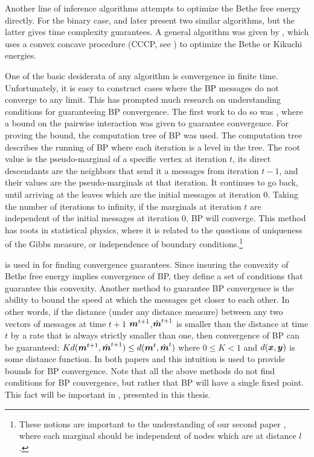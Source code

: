 Another line of inference algorithms attempts to optimize the Bethe free energy directly.
For the binary case,  \cite{welling2001belief} and later  \cite{shin2012complexity} present two similar algorithms, but the latter gives time complexity guarantees. A general algorithm was given by  \cite{yuille2002cccp}, which uses a convex concave procedure (CCCP, see  \cite{yuille2002concave}) to optimize the Bethe or Kikuchi energies.

One of the basic desiderata of any algorithm is convergence in finite time. Unfortunately, it is easy to construct cases where the
BP messages do not converge to any limit. This has prompted much research on understanding conditions for guaranteeing BP convergence.
The first work to do so was  \cite{tatikonda2002loopy}, where a bound on the pairwise interaction was given to guarantee convergence.
For proving the bound, the computation tree of BP was used.
The computation tree describes the running of BP where each iteration is a level in the tree.
The root value is the pseudo-marginal of a specific vertex at iteration $t$, its direct descendants are the neighbors that send it a messages from iteration $t-1$, and their values are the pseudo-marginals at that iteration.
It continues to go back, until arriving at the leaves which are the initial messages at iteration $0$.
Taking the number of iterations to infinity, if the marginals at iteration $t$ are independent of the initial messages at iteration $0$, BP will converge.
This method has roots in statistical physics, where it is related to the questions of uniqueness of the Gibbs measure, or independence of boundary conditions.\footnote{These notions are important to the understanding of our second paper  \cite{heinemann2014inferning}, where each marginal should be independent of nodes which are at distance $l$.}

 is used in  \cite{heskes2004uniqueness} for finding convergence guarantees.
Since insuring the convexity of Bethe free energy implies convergence of BP, they define a set of conditions that guarantee this convexity.
Another method to guarantee BP convergence is the ability to bound the speed at which the messages get closer to each other.
In other words, if the distance (under any distance measure) between any two vectors of messages at time $t+1$ $\boldsymbol{m}^{t+1}$,$\hat{\boldsymbol{m}}^{t+1}$ is smaller than the distance at time $t$ by a rate that is always strictly smaller than one, then convergence of BP can be guaranteed: $ K d(\boldsymbol{m}^{t+1}, \hat{\boldsymbol{m}}^{t+1}) \leq d(\boldsymbol{m}^t, \hat{\boldsymbol{m}}^t)$ where $0\leq K<1$ and $d(\boldsymbol{x},\boldsymbol{y})$ is some distance function.
In both papers  \cite{mooij2007sufficient} and  \cite{roosta2008convergence} this intuition is used to provide bounds for BP convergence.
Note that all the above methods do not find conditions for BP convergence, but rather that BP will have a single fixed point.
This fact will be important in \cite{heinemann2012cannot}, presented in this thesis.

